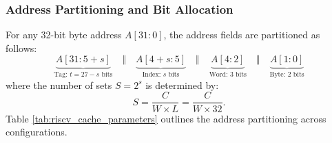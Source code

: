 \subsubsection{Address Partitioning and Bit Allocation}
For any 32-bit byte address $A[31:0]$, the address fields are partitioned as follows:
\begin{equation}
\underbrace{A[31 : 5 + s]}_{\text{Tag: } t = 27 - s \text{ bits}} \quad \Big\Vert \quad \underbrace{A[4 + s : 5]}_{\text{Index: } s \text{ bits}} \quad \Big\Vert \quad \underbrace{A[4 : 2]}_{\text{Word: } 3 \text{ bits}} \quad \Big\Vert \quad \underbrace{A[1 : 0]}_{\text{Byte: } 2 \text{ bits}}
\end{equation}
where the number of sets $S = 2^s$ is determined by:
\begin{equation}
S = \frac{C}{W \times L} = \frac{C}{W \times 32}.
\end{equation}
Table \ref{tab:riscv_cache_parameters} outlines the address partitioning across configurations.

\begin{table}[htbp]
\centering
{}
\caption{Address bit partitioning for 32-byte cache lines across evaluated L1 cache capacities and associativities.}\label{tab:riscv_cache_parameters}
\end{table}

